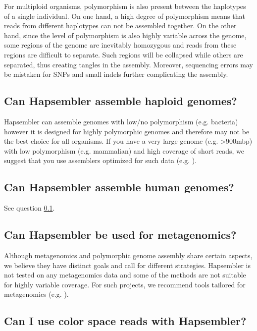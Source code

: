 \documentclass[12pt,a4paper]{report}
\begin{document}
For multiploid organisms, polymorphism is also present between the haplotypes of a single individual. On one hand, a high degree of polymorphism means that reads from different haplotypes can not be assembled together. On the other hand, since the level of polymorphism is also highly variable across the genome, some regions of the genome are inevitably homozygous and reads from these regions are difficult to separate. Such regions will be collapsed while others are separated, thus creating tangles in the assembly. Moreover, sequencing errors may be mistaken for SNPs and small indels further complicating the assembly.

\subsection{Can Hapsembler assemble haploid genomes?}
\label{haploid}

Hapsembler can assemble genomes with low/no polymorphism (e.g. bacteria) however it is designed for highly polymorphic genomes and therefore may not be the best choice for all organisms. If you have a very large genome (e.g. >900mbp) with low polymorphism (e.g. mammalian) and high coverage of short reads, we suggest that you use assemblers optimized for such data (e.g. \cite{simpson}).

\subsection{Can Hapsembler assemble human genomes?}

See question \ref{haploid}.

\subsection{Can Hapsembler be used for metagenomics?}

Although metagenomics and polymorphic genome assembly share certain aspects, we believe they have distinct goals and call for different strategies. Hapsembler is not tested on any metagenomics data and some of the methods are not suitable for highly variable coverage. For such projects, we recommend tools tailored for metagenomics (e.g. \cite{laserson}).

\subsection{Can I use color space reads with Hapsembler?}
\end{document}
